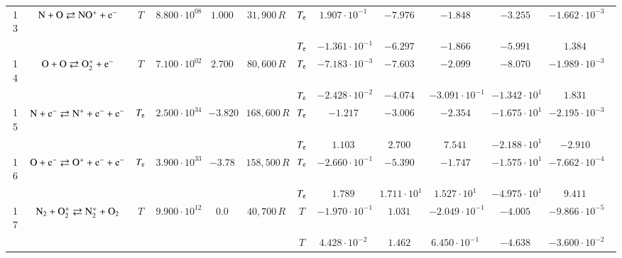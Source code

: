 \documentclass{warpdoc}
\begin{document}
\begin{table}[!ht]
\begin{center}
\begin{threeparttable}
\begin{tabular}{ccccccccccccc}
                                          
13 & $\rm N + O \rightleftarrows NO^{+}+e^-$ &$T$ & $8.800 \cdot 10^{08}$ & $1.000$ & $31,900 \, R$ 
                                          &$T_{\rm e}$  & $1.907 \cdot 10^{-1}$  & $-7.976$  & $-1.848$ & $-3.255$ & $-1.662 \cdot 10^{-3}$ & \multirow{2}{*}{\cite{jtht:1993:park,ijhmt:2021:kim}} \\
 & & & & &                                &$T_{\rm e}$  & $-1.361 \cdot 10^{-1}$  & $-6.297$  & $-1.866$ & $-5.991$ & $1.384$ & ~ \\
 
                                          
14 & $\rm O + O \rightleftarrows O_2^{+}+e^-$ &$T$ & $7.100 \cdot 10^{02}$ & $2.700$ & $80,600\, R$ 
                                          &$T_{\rm e}$  & $-7.183 \cdot 10^{-3}$  & $-7.603$  & $-2.099$ & $-8.070$ & $-1.989 \cdot 10^{-3}$ & \multirow{2}{*}{\cite{jtht:1993:park,ijhmt:2021:kim}} \\
 & & & & &                                &$T_{\rm e}$  & $-2.428 \cdot 10^{-2}$  & $-4.074$  & $-3.091 \cdot 10^{-1}$ & $-1.342 \cdot 10^{1}$ & $1.831$ & ~ \\
 
                                          
15 & $\rm N + e^- \rightleftarrows N^{+}+e^{-}+e^{-}$ &$T_{\rm e}$ & $2.500 \cdot 10^{34}$ & $-3.820$ & $168,600 \, R$ 
                                          &$T_{\rm e}$  & $-1.217$  & $-3.006$  & $-2.354$ & $-1.675 \cdot 10^{1}$ & $-2.195 \cdot 10^{-3}$ & \multirow{2}{*}{\cite{book:1990:park,ijhmt:2021:kim}} \\
 & & & & &                                &$T_{\rm e}$  & $1.103$  & $2.700$  & $7.541$ & $-2.188 \cdot 10^{1}$ & $-2.910$ & ~ \\
 
                                          
16 & $\rm O + e^- \rightleftarrows O^{+}+e^{-}+e^{-}$ &$T_{\rm e}$ & $3.900 \cdot 10^{33}$ & $-3.78$ & $158,500\, R$ 
                                          &$T_{\rm e}$  & $-2.660 \cdot 10^{-1}$  & $-5.390$  & $-1.747$ & $-1.575 \cdot 10^{1}$ & $-7.662 \cdot 10^{-4}$ & \multirow{2}{*}{\cite{book:1990:park,ijhmt:2021:kim}} \\
 & & & & &                                &$T_{\rm e}$  & $1.789$  & $1.711 \cdot 10^{1}$  & $1.527 \cdot 10^{1}$ & $-4.975 \cdot 10^{1}$ & $9.411$ & ~ \\
 
                                          
17 & $\rm N_2 + O_2^+ \rightleftarrows N_2^+ + O_2 $ &$T$ & $9.900 \cdot 10^{12}$ & $0.0$ & $40,700\, R$ 
                                          &$T$  & $-1.970 \cdot 10^{-1}$  & $1.031$  & $-2.049 \cdot 10^{-1}$ & $-4.005$ & $-9.866 \cdot 10^{-5}$ & \multirow{2}{*}{\cite{book:1990:park,ijhmt:2021:kim}} \\
 & & & & &                                &$T$  & $4.428 \cdot 10^{-2}$  & $1.462$  & $6.450 \cdot 10^{-1}$ & $-4.638$ & $-3.600 \cdot 10^{-2}$ & ~ \\
 

\end{tabular}
\end{threeparttable}
\end{center}
\end{table}
\end{document}
